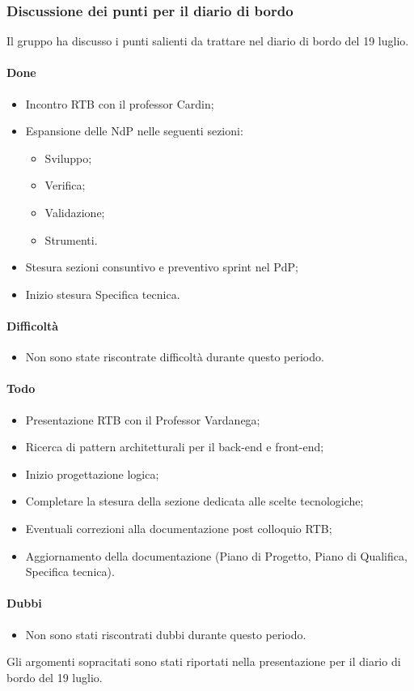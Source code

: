 \subsubsection{Discussione dei punti per il diario di bordo}
\par Il gruppo ha discusso i punti salienti da trattare nel diario di bordo del 19 luglio.
\paragraph{Done}
\begin{itemize}
	\item Incontro RTB con il professor Cardin;
	\item Espansione delle NdP nelle seguenti sezioni:
	\begin{itemize}
		\item Sviluppo;
		\item Verifica; 
		\item Validazione;
		\item Strumenti.
	\end{itemize}
	\item Stesura sezioni consuntivo e preventivo sprint nel PdP;
	\item Inizio stesura Specifica tecnica.
\end{itemize}
\paragraph{Difficoltà}
\begin{itemize}
	\item Non sono state riscontrate difficoltà durante questo periodo.
\end{itemize}	

\paragraph{Todo}
\begin{itemize}
	\item Presentazione RTB con il Professor Vardanega;
	\item Ricerca di pattern architetturali per il back-end e front-end;
	\item Inizio progettazione logica;
	\item Completare la stesura della sezione dedicata alle scelte tecnologiche;
	\item Eventuali correzioni alla documentazione post colloquio RTB;
	\item Aggiornamento della documentazione (Piano di Progetto, Piano di Qualifica, Specifica tecnica).
\end{itemize}

\paragraph{Dubbi}
\begin{itemize}
	\item Non sono stati riscontrati dubbi durante questo periodo.
\end{itemize}

\vspace{0.5\baselineskip}
\par Gli argomenti sopracitati sono stati riportati nella presentazione per il diario di bordo del 19 luglio.
